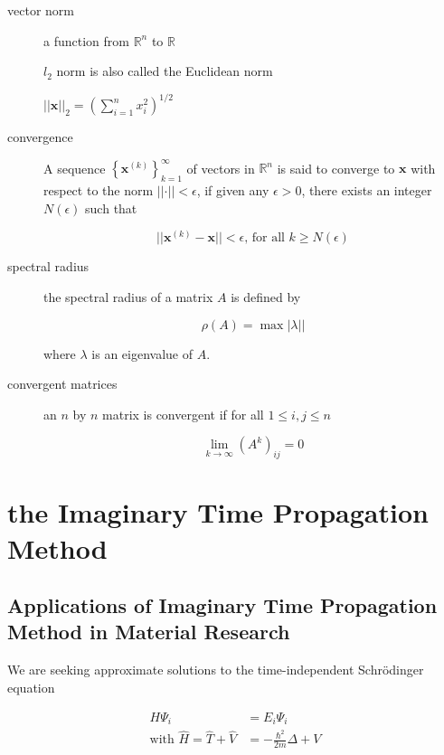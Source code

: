 \documentclass[12pt,]{book}
\newenvironment{Shaded}{}{}
\newcommand{\R}{\mathbb{R}}
\begin{document}
\begin{description}
\item[vector norm]
a function from \(\R^n\) to \(\R\)

\(l_2\) norm is also called the Euclidean norm

\(\rvert\rvert \mathbf{x} \rvert\rvert_2 = \left(\sum_{i=1}^nx_i^2\right)^{1/2}\)
\item[convergence]
A sequence \(\left\{\mathbf{x}^{(k)}\right\}_{k=1}^\infty\) of vectors
in \(\R^n\) is said to converge to \(\mathbf{x}\) with respect to the
norm \(\rvert\rvert \cdot \rvert\rvert<\epsilon\), if given any
\(\epsilon>0\), there exists an integer \(N(\epsilon)\) such that

\[\rvert\rvert\mathbf{x}^{(k)}-\mathbf{x}\rvert\rvert<\epsilon
  \text{, for all }k\geq N(\epsilon)\]
\item[spectral radius]
the spectral radius of a matrix \(A\) is defined by

\[\rho(A)=\max\rvert\lambda\rvert|\]

where \(\lambda\) is an eigenvalue of \(A\).
\item[convergent matrices]
an \(n\) by \(n\) matrix is convergent if for all \(1\leq i,j \leq n\)

\[\lim_{k\to\infty}(A^k)_{ij}=0\]
\end{description}

\begin{Shaded}
\begin{Highlighting}[]

\end{Highlighting}
\end{Shaded}

\chapter{the Imaginary Time Propagation
Method}\label{the-imaginary-time-propagation-method}

\section{Applications of Imaginary Time Propagation Method in Material
Research}\label{applications-of-imaginary-time-propagation-method-in-material-research}

We are seeking approximate solutions to the time-independent Schrödinger
equation

\begin{align*}
H\Psi_i&=E_i\Psi_i\tag{eqn. 1}\\
\text{with }\hat{H}=\hat T + \hat V &= -\frac{\hbar^2}{2m}\Delta + V
\end{align*}
\end{document}

